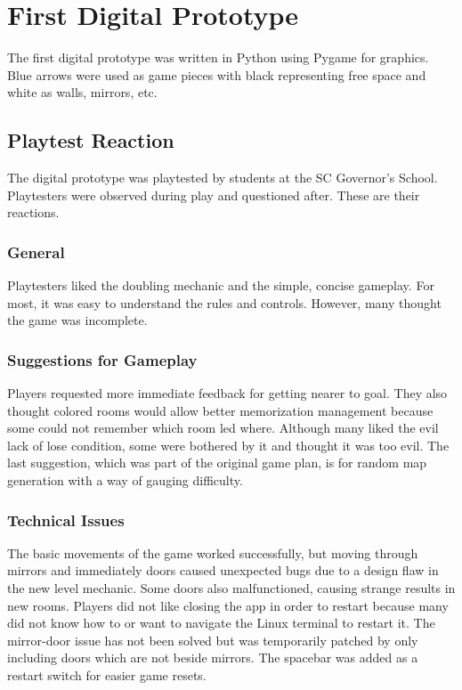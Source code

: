 \documentclass{scrreprt}
\begin{document}
		\section{First Digital Prototype}
			The first digital prototype was written in Python using Pygame for graphics. Blue arrows were used as game pieces with black representing free space and white as walls, mirrors, etc.
			
			\subsection{Playtest Reaction}
				The digital prototype was playtested by students at the SC Governor's School. Playtesters were observed during play and questioned after. These are their reactions.
				
				\subsubsection{General}
					Playtesters liked the doubling mechanic and the simple, concise gameplay. For most, it was easy to understand the rules and controls. However, many thought the game was incomplete.
					
				\subsubsection{Suggestions for Gameplay}
					Players requested more immediate feedback for getting nearer to goal. They also thought colored rooms would allow better memorization management because some could not remember which room led where. Although many liked the evil lack of lose condition, some were bothered by it and thought it was too evil. The last suggestion, which was part of the original game plan, is for random map generation with a way of gauging difficulty.
				
				\subsubsection{Technical Issues}
					The basic movements of the game worked successfully, but moving through mirrors and immediately doors caused unexpected bugs due to a design flaw in the new level mechanic. Some doors also malfunctioned, causing strange results in new rooms. Players did not like closing the app in order to restart because many did not know how to or want to navigate the Linux terminal to restart it. The mirror-door issue has not been solved but was temporarily patched by only including doors which are not beside mirrors. The spacebar was added as a restart switch for easier game resets.
			
\end{document}
